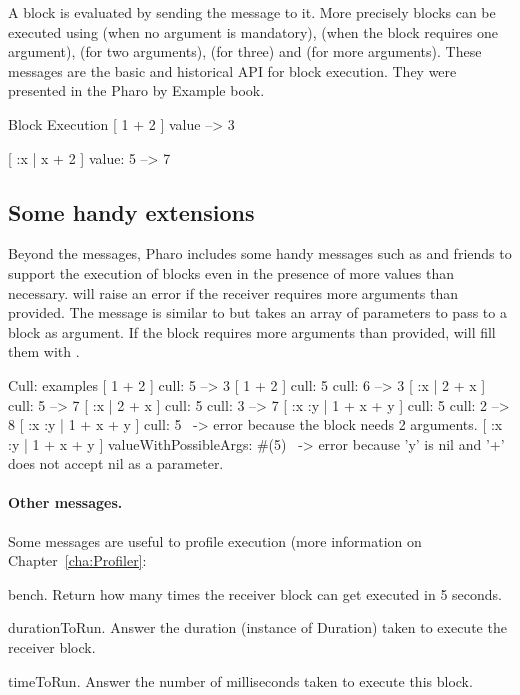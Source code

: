 \documentclass[a4paper,10pt,twoside]{book}
\begin{document}
 A block is evaluated by sending the  message to it. More precisely blocks can be executed using  (when no argument is mandatory),  (when the block requires one argument),  (for two arguments),  (for three) and  (for more arguments). These messages are the basic and historical API for block execution. They were presented in the Pharo by Example book.

\begin{code}{Block Execution}
[ 1 + 2 ] value --> 3

[ :x | x + 2 ] value: 5 --> 7
\end{code}

\subsection{Some handy extensions}

Beyond the  messages, Pharo includes some handy messages
such as  and friends to support the execution of blocks even
in the presence of more values than necessary.  will raise
an error if the receiver requires more arguments than provided. The
 message is similar to  but takes
an array of parameters to pass to a block as argument. If the block
requires more arguments than provided, 
will fill them with .

\begin{code}{Cull: examples}
[ 1 + 2 ] cull: 5 --> 3
[ 1 + 2 ] cull: 5 cull: 6 --> 3
[ :x | 2 + x ] cull: 5 --> 7
[ :x | 2 + x ] cull: 5 cull: 3 --> 7
[ :x :y | 1 + x + y ] cull: 5 cull: 2 --> 8
[ :x :y | 1 + x + y ] cull: 5 ~-> error because the block needs 2 arguments.
[ :x :y | 1 + x + y ] valueWithPossibleArgs: #(5)
                      ~-> error because 'y' is nil and '+' does not accept nil as a parameter.
\end{code}


\paragraph{Other messages.}

Some messages are useful to profile execution (more information on Chapter~\ref{cha:Profiler}:

\begin{description}
\item{\textsf{bench}}. Return how many times the receiver block can get executed in 5 seconds.

\item{\textsf{durationToRun}}. Answer the duration (instance of Duration) taken to execute the receiver block.

\item{\textsf{timeToRun}}. Answer the number of milliseconds taken to execute this block.
\end{description}
\end{document}
